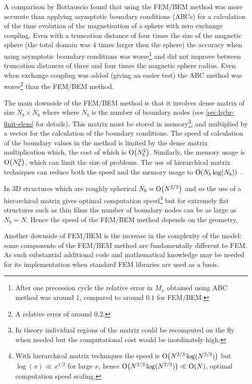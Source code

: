 A comparison by Bottauscio \cite{Bottauscio2008} found that using the FEM/BEM method was more accurate than applying asymptotic boundary conditions (ABCs) for a calculation of the time evolution of the magnetisation of a sphere with zero exchange coupling.
Even with a truncation distance of four times the size of the magnetic sphere (the total domain was $4$ times larger then the sphere) the accuracy when using asymptotic boundary conditions was worse\footnote{After one precession cycle the relative error in $M_x$ obtained using ABC method was around 1, compared to around $0.1$ for FEM/BEM.} and did not improve between truncation distances of three and four times the magnetic sphere radius.
Even when exchange coupling was added (giving an easier test) the ABC method was worse\footnote{A relative error of around $0.2$.} than the FEM/BEM method.

The main downside of the FEM/BEM method is that it involves dense matrix of size $N_b \times N_b$ where where $N_b$ is the number of boundary nodes (see \cref{sec:hybr-finit-elem} for details).
This matrix must be stored in memory\footnote{In theory individual regions of the matrix could be recomputed on the fly when needed but the computational cost would be inordinately high.}, and multiplied by a vector for the calculation of the boundary conditions.
The speed of calculation of the boundary values in the method is limited by the dense matrix multiplication which, the cost of which is $\mathrm{O}{\left( N_b^2 \right)}$.
Similarly, the memory usage is $\mathrm{O}{\left( N_b^2 \right)}$, which can limit the size of problems.
The use of hierarchical matrix techniques can reduce both the speed and the memory usage to $\mathrm{O}{\left( N_b \log(N_b) \right)}$ \cite{Knittel2009}.

In 3D structures which are roughly spherical $N_b = \mathrm{O}{\left( N^{2/3} \right)}$ and so the use of a hierarchical matrix gives optimal computation speed\footnote{With hierarchical matrix techniques the speed is $\mathrm{O}{\left( N^{2/3}\log(N^{2/3}) \right)}$ but $\log(x) \ll x^{1/2}$ for large $x$, hence $\mathrm{O}{\left( N^{2/3}\log(N^{2/3}) \right)} \ll \mathrm{O}{\left( N \right)}$, \ie optimal computation speed scaling.} but for extremely flat structures such as thin films the number of boundary nodes can be as large as $N_b = N$.
Hence the speed of the FEM/BEM method depends on the geometry.

Another downside of FEM/BEM is the increase in the complexity of the model: some components of the FEM/BEM method are fundamentally different to FEM.
As such substantial additional code and mathematical knowledge may be needed for its implementation when standard FEM libraries are used as a basis.


